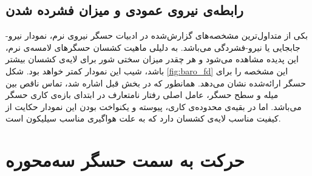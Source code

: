 \subsection{رابطه‌ی نیرو‌ی عمودی و میزان فشرده شدن}

بکی از متداول‌ترین مشخصه‌های گزارش‌شده در ادبیات حسگر نیرو‌ی نرم، نمودار نیرو-جابجایی یا نیرو-فشردگی می‌باشد. به دلیلی ماهیت کشسان حسگر‌های لامسه‌ی نرم، این پدیده مشاهده می‌شود و هر چقدر میزان سختی شور برای لایه‌ی کشسان بیشتر باشد، شیب این نمودار کمتر خواهد بود. شکل
\ref{fig:baro_fd}
این مشخصه را برای حسگر ارائه‌شده نشان می‌دهد. همانطور که در بخش قبل اشاره شد، تماس ناقص بین میله و سطح حسگر، عامل اصلی رفتار نامتعارف در ابتدای بازه‌ی کاری حسگر می‌باشد. اما در بقیه‌ی محدوده‌ی کاری، پیوسته و یکنواخت بودن این نمودار حکایت از کیفیت مناسب لایه‌ی کشسان دارد که به علت هواگیری مناسب سیلیکون است.

\section{حرکت به سمت حسگر سه‌محوره}

